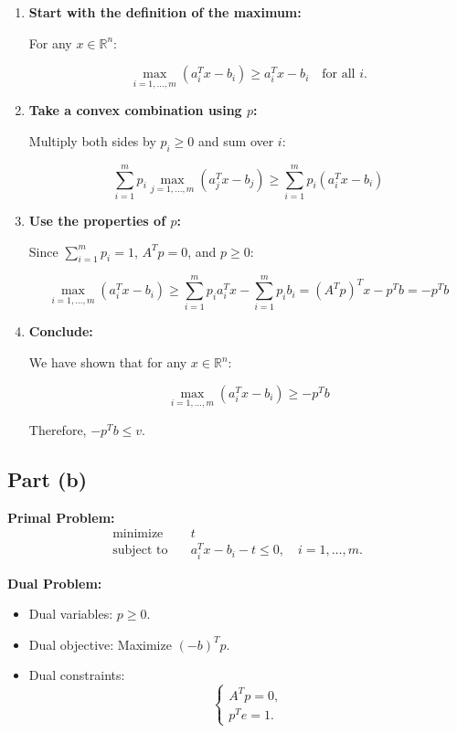 \documentclass{article}
\begin{document}
\begin{enumerate}
    \item \textbf{Start with the definition of the maximum:}
    
    For any $x \in \mathbb{R}^n$:
    
    \[
    \max_{i=1,\dots,m}(a_i^T x - b_i) \geq a_i^T x - b_i \quad \text{for all } i.
    \]

    \item \textbf{Take a convex combination using $p$:}
    
    Multiply both sides by $p_i \geq 0$ and sum over $i$:
    
    \[
    \sum_{i=1}^m p_i \max_{j=1,\dots,m}(a_j^T x - b_j) \geq \sum_{i=1}^m p_i (a_i^T x - b_i)
    \]

    \item \textbf{Use the properties of $p$:}
    
    Since $\sum_{i=1}^m p_i = 1$, $A^T p = 0$, and $p \geq 0$:
    
    \[
    \max_{i=1,\dots,m}(a_i^T x - b_i) \geq \sum_{i=1}^m p_i a_i^T x - \sum_{i=1}^m p_i b_i = (A^T p)^T x - p^T b = -p^T b
    \]

    \item \textbf{Conclude:}
    
    We have shown that for any $x \in \mathbb{R}^n$:
    
    \[
    \max_{i=1,\dots,m}(a_i^T x - b_i) \geq -p^T b
    \]
    
    Therefore, $-p^T b \leq v$.
\end{enumerate}

\subsection{Part (b)}

\textbf{Primal Problem:}
\[
\begin{aligned}
\text{minimize} \quad & t \\
\text{subject to} \quad & a_i^T x - b_i - t \leq 0, \quad i = 1,\dots,m.
\end{aligned}
\]

\textbf{Dual Problem:}
\begin{itemize}
    \item Dual variables: $p \geq 0$.
    \item Dual objective: Maximize $(-b)^T p$.
    \item Dual constraints:
    \[
    \begin{cases}
    A^T p = 0, \\
    p^T e = 1.
    \end{cases}
    \]
\end{itemize}
\end{document}
